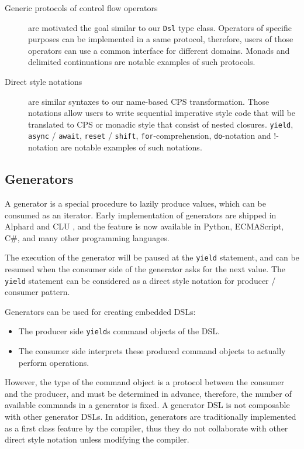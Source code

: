 \begin{description}
  \item[Generic protocols of control flow operators] are motivated the goal similar to our \lstinline{Dsl} type class. Operators of specific purposes can be implemented in a same protocol, therefore, users of those operators can use a common interface for different domains. Monads and delimited continuations are notable examples of such protocols.
  \item[Direct style notations] are similar syntaxes to our name-based CPS transformation. Those notations allow users to write sequential imperative style code that will be translated to CPS or monadic style that consist of nested closures. \lstinline{yield}, \lstinline{async} / \lstinline{await}, \lstinline{reset} / \lstinline{shift}, \lstinline{for}-comprehension, \lstinline{do}-notation and !-notation are notable examples of such notations.
\end{description}

\subsection{Generators}

A generator is a special procedure to lazily produce values, which can be consumed as an iterator. Early implementation of generators are shipped in Alphard \cite{shaw1977abstraction} and CLU \cite{liskov1977abstraction}, and the feature is now available in  Python, ECMAScript, C\#, and many other programming languages.

The execution of the generator will be paused at the \lstinline{yield} statement, and can be resumed when the consumer side of the generator asks for the next value. The \lstinline{yield} statement can be considered as a direct style notation for producer / consumer pattern.

Generators can be used for creating embedded DSLs:

\begin{itemize}
  \item The producer side \lstinline{yield}s command objects of the DSL.
  \item The consumer side interprets these produced command objects to actually perform operations.
\end{itemize}

However, the type of the command object is a protocol between the consumer and the producer, and must be determined in advance, therefore, the number of available commands in a generator is fixed. A generator DSL is not composable with other generator DSLs. In addition, generators are traditionally implemented as a first class feature by the compiler, thus they do not collaborate with other direct style notation unless modifying the compiler.


